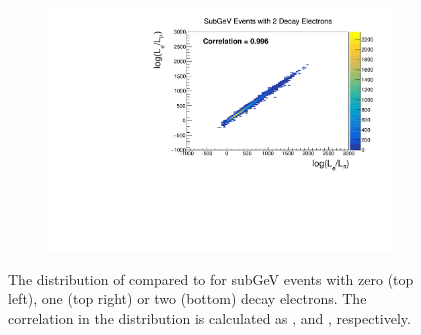 \begin{figure}[h]
\begin{subfigure}[t]{0.49\textwidth}
    \includegraphics[width=\textwidth, trim={0mm 0mm 0mm 0mm}, clip,page=1]{Figures/Selections/Correlation_SG2Dcy.pdf}
  \end{subfigure}
  \caption{The distribution of  compared to  for subGeV events with zero (top left), one (top right) or two (bottom) decay electrons. The correlation in the distribution is calculated as ,  and , respectively.}
  \label{fig:SelsAndSysts_LLHCorrelation}
\end{figure}
